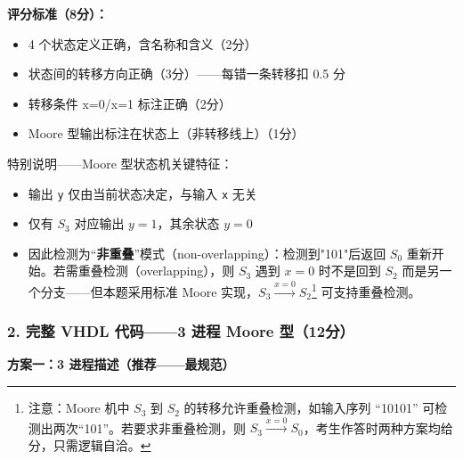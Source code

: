 \textbf{评分标准（8分）：}
\begin{itemize}
    \item 4 个状态定义正确，含名称和含义（2分）
    \item 状态间的转移方向正确（3分）——每错一条转移扣 0.5 分
    \item 转移条件 x=0/x=1 标注正确（2分）
    \item Moore 型输出标注在状态上（非转移线上）（1分）
\end{itemize}

特别说明——Moore 型状态机关键特征：
\begin{itemize}
    \item 输出 \texttt{y} 仅由当前状态决定，与输入 \texttt{x} 无关
    \item 仅有 $S_3$ 对应输出 $y=1$，其余状态 $y=0$
    \item 因此检测为“\textbf{非重叠}”模式（non-overlapping）：检测到"101"后返回 $S_0$ 重新开始。若需重叠检测（overlapping），则 $S_3$ 遇到 $x=0$ 时不是回到 $S_2$ 而是另一个分支——但本题采用标准 Moore 实现，$S_3\xrightarrow{x=0}S_2$\footnote{注意：Moore 机中 $S_3$ 到 $S_2$ 的转移允许重叠检测，如输入序列 “10101” 可检测出两次“101”。若要求非重叠检测，则 $S_3\xrightarrow{x=0}S_0$，考生作答时两种方案均给分，只需逻辑自洽。} 可支持重叠检测。
\end{itemize}

\subsubsection*{2. 完整 VHDL 代码——3 进程 Moore 型（12分）}

\textbf{方案一：3 进程描述（推荐——最规范）}

